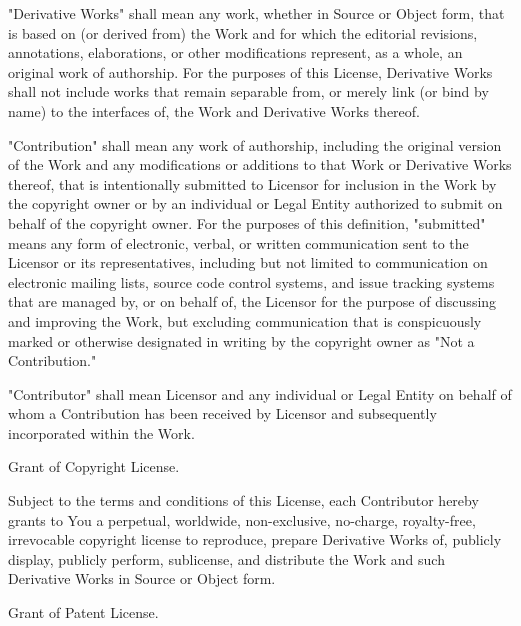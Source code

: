 "{}\+Derivative Works"{} shall mean any work, whether in Source or Object form, that is based on (or derived from) the Work and for which the editorial revisions, annotations, elaborations, or other modifications represent, as a whole, an original work of authorship. For the purposes of this License, Derivative Works shall not include works that remain separable from, or merely link (or bind by name) to the interfaces of, the Work and Derivative Works thereof.

"{}\+Contribution"{} shall mean any work of authorship, including the original version of the Work and any modifications or additions to that Work or Derivative Works thereof, that is intentionally submitted to Licensor for inclusion in the Work by the copyright owner or by an individual or Legal Entity authorized to submit on behalf of the copyright owner. For the purposes of this definition, "{}submitted"{} means any form of electronic, verbal, or written communication sent to the Licensor or its representatives, including but not limited to communication on electronic mailing lists, source code control systems, and issue tracking systems that are managed by, or on behalf of, the Licensor for the purpose of discussing and improving the Work, but excluding communication that is conspicuously marked or otherwise designated in writing by the copyright owner as "{}\+Not a Contribution."{}

"{}\+Contributor"{} shall mean Licensor and any individual or Legal Entity on behalf of whom a Contribution has been received by Licensor and subsequently incorporated within the Work.


\begin{DoxyEnumerate}
\item Grant of Copyright License.
\end{DoxyEnumerate}

Subject to the terms and conditions of this License, each Contributor hereby grants to You a perpetual, worldwide, non-\/exclusive, no-\/charge, royalty-\/free, irrevocable copyright license to reproduce, prepare Derivative Works of, publicly display, publicly perform, sublicense, and distribute the Work and such Derivative Works in Source or Object form.


\begin{DoxyEnumerate}
\item Grant of Patent License.
\end{DoxyEnumerate}

